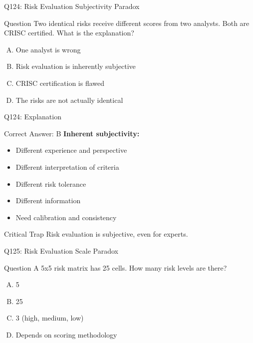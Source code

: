 \documentclass{beamer}
\begin{document}
	\begin{frame}{Q124: Risk Evaluation Subjectivity Paradox}
		\begin{block}{Question}
			Two identical risks receive different scores from two analysts. Both are CRISC certified. What is the explanation?
		\end{block}
		\begin{enumerate}[(A)]
			\item One analyst is wrong
			\item Risk evaluation is inherently subjective
			\item CRISC certification is flawed
			\item The risks are not actually identical
		\end{enumerate}
	\end{frame}
	
	\begin{frame}{Q124: Explanation}
		\begin{block}{Correct Answer: B}
			\textbf{Inherent subjectivity:}
			\begin{itemize}
				\item Different experience and perspective
				\item Different interpretation of criteria
				\item Different risk tolerance
				\item Different information
				\item Need calibration and consistency
			\end{itemize}
		\end{block}
		\begin{alertblock}{Critical Trap}
			Risk evaluation is subjective, even for experts.
		\end{alertblock}
	\end{frame}
	
	\begin{frame}{Q125: Risk Evaluation Scale Paradox}
		\begin{block}{Question}
			A 5x5 risk matrix has 25 cells. How many risk levels are there?
		\end{block}
		\begin{enumerate}[(A)]
			\item 5
			\item 25
			\item 3 (high, medium, low)
			\item Depends on scoring methodology
		\end{enumerate}
	\end{frame}
	
\end{document}
